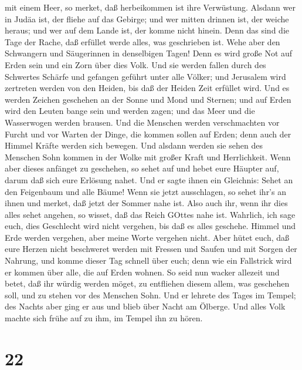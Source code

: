 mit einem Heer, so merket, daß herbeikommen ist ihre Verwüstung.
 Alsdann wer in Judäa ist, der fliehe auf das Gebirge; und
wer mitten drinnen ist, der weiche heraus; und wer auf dem Lande ist,
der komme nicht hinein.  Denn das sind die Tage der Rache,
daß erfüllet werde alles, was geschrieben ist.  Wehe aber
den Schwangern und Säugerinnen in denselbigen Tagen! Denn es wird große
Not auf Erden sein und ein Zorn über dies Volk.  Und sie
werden fallen durch des Schwertes Schärfe und gefangen geführt unter
alle Völker; und Jerusalem wird zertreten werden von den Heiden, bis daß
der Heiden Zeit erfüllet wird.  Und es werden Zeichen
geschehen an der Sonne und Mond und Sternen; und auf Erden wird den
Leuten bange sein und werden zagen; und das Meer und die Wasserwogen
werden brausen.  Und die Menschen werden verschmachten vor
Furcht und vor Warten der Dinge, die kommen sollen auf Erden; denn auch
der Himmel Kräfte werden sich bewegen.  Und alsdann werden
sie sehen des Menschen Sohn kommen in der Wolke mit großer Kraft und
Herrlichkeit.  Wenn aber dieses anfänget zu geschehen, so
sehet auf und hebet eure Häupter auf, darum daß sich eure Erlösung
nahet.  Und er sagte ihnen ein Gleichnis: Sehet an den
Feigenbaum und alle Bäume!  Wenn sie jetzt ausschlagen, so
sehet ihr's an ihnen und merket, daß jetzt der Sommer nahe ist.
 Also auch ihr, wenn ihr dies alles sehet angehen, so
wisset, daß das Reich GOttes nahe ist.  Wahrlich, ich sage
euch, dies Geschlecht wird nicht vergehen, bis daß es alles geschehe.
 Himmel und Erde werden vergehen, aber meine Worte vergehen
nicht.  Aber hütet euch, daß eure Herzen nicht beschweret
werden mit Fressen und Saufen und mit Sorgen der Nahrung, und komme
dieser Tag schnell über euch;  denn wie ein Fallstrick wird
er kommen über alle, die auf Erden wohnen.  So seid nun
wacker allezeit und betet, daß ihr würdig werden möget, zu entfliehen
diesem allem, was geschehen soll, und zu stehen vor des Menschen Sohn.
 Und er lehrete des Tages im Tempel; des Nachts aber ging
er aus und blieb über Nacht am Ölberge.  Und alles Volk
machte sich frühe auf zu ihm, im Tempel ihn zu hören.

\hypertarget{section-21}{%
\section{22}\label{section-21}}

